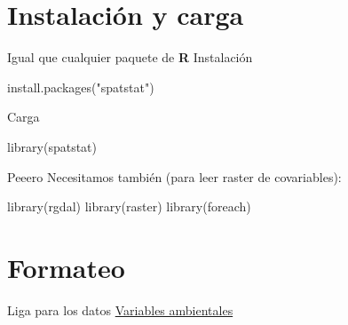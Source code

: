 \documentclass[
  11pt,
  ignorenonframetext,
]{beamer}
\newenvironment{Shaded}{}{}
\newcommand{\FunctionTok}[1]{\textcolor[rgb]{0.02,0.16,0.49}{#1}}
\newcommand{\NormalTok}[1]{#1}
\newcommand{\StringTok}[1]{\textcolor[rgb]{0.25,0.44,0.63}{#1}}
\begin{document}
\hypertarget{instalaciuxf3n-y-carga}{%
\section{Instalación y carga}\label{instalaciuxf3n-y-carga}}

\begin{frame}[fragile]{Igual que cualquier paquete de \textbf{R}}
\protect\hypertarget{igual-que-cualquier-paquete-de-r}{}
Instalación

\begin{Shaded}
\begin{Highlighting}[]
\FunctionTok{install.packages}\NormalTok{(}\StringTok{"spatstat"}\NormalTok{)}
\end{Highlighting}
\end{Shaded}

Carga

\begin{Shaded}
\begin{Highlighting}[]
\FunctionTok{library}\NormalTok{(spatstat)}
\end{Highlighting}
\end{Shaded}
\end{frame}

\begin{frame}[fragile]{Peeero}
\protect\hypertarget{peeero}{}
Necesitamos también (para leer raster de covariables):

\begin{Shaded}
\begin{Highlighting}[]
\FunctionTok{library}\NormalTok{(rgdal)}
\FunctionTok{library}\NormalTok{(raster)}
\FunctionTok{library}\NormalTok{(foreach)}
\end{Highlighting}
\end{Shaded}
\end{frame}

\hypertarget{formateo}{%
\section{Formateo}\label{formateo}}

\begin{frame}{Liga para los datos}
\protect\hypertarget{liga-para-los-datos}{}
\href{Datos-ejemplos/Covariables.zip}{Variables ambientales}
\end{frame}
\end{document}
